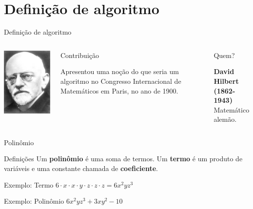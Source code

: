 \documentclass[xcolor=dvipsnames,table]{beamer}
\begin{document}
\section{Definição de algoritmo}

	\begin{frame}{Definição de algoritmo}
		\begin{columns}
		  		\begin{center}
		    		\includegraphics[height=.5\textheight]{images/hilbert.jpg}
		  		\end{center}
				\begin{block}{Contribuição}
					\begin{center}
						{\large Apresentou uma noção do que seria um algoritmo no Congresso Internacional de Matemáticos em Paris, no ano de 1900.}
					\end{center}
				\end{block}		  		
		  		\begin{block}{Quem?}
		  			\begin{center}
						{\bf David Hilbert (1862-1943)} \\ Matemático alemão.
					\end{center}
				\end{block}
		\end{columns}
	\end{frame}
	
	\begin{frame}{Polinômio}
		\begin{block}{Definições}	
			Um {\bf polinômio} é uma soma de termos. Um {\bf termo} é um produto de variáveis e uma constante chamada de {\bf coeficiente}.
		\end{block}\pause
		\begin{block}{Exemplo: Termo}
			$6 \cdot x \cdot x \cdot y \cdot z \cdot z \cdot z= 6x^2 y z^3$
		\end{block}\pause
		\begin{block}{Exemplo: Polinômio}
			$6x^2 y z^3 + 3x y^2 - 10$
		\end{block}
	\end{frame}
	
\end{document}
